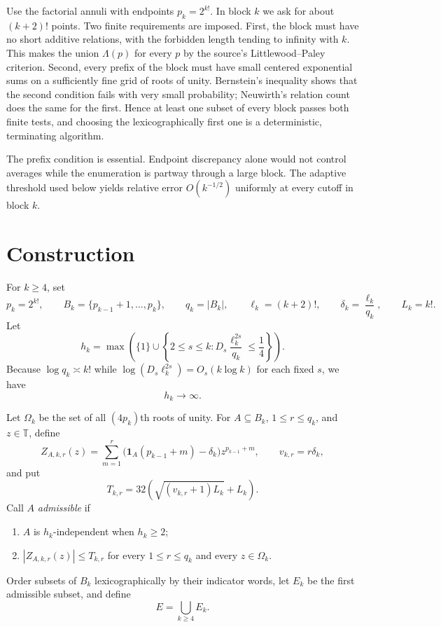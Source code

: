 \documentclass[11pt]{amsart}
\newcommand{\T}{\mathbb T}
\newcommand{\1}{\mathbf 1}
\newcommand{\card}[1]{\lvert #1\rvert}
\theoremstyle{definition}
\theoremstyle{remark}
\begin{document}
Use the factorial annuli with endpoints $p_k=2^{k!}$.  In block $k$ we ask
for about $(k+2)!$ points.  Two finite requirements are imposed.  First, the
block must have no short additive relations, with the forbidden length
tending to infinity with $k$.  This makes the union $\Lambda(p)$ for every
$p$ by the source's Littlewood--Paley criterion.  Second, every prefix of the
block must have small centered exponential sums on a sufficiently fine grid
of roots of unity.  Bernstein's inequality shows that the second condition
fails with very small probability; Neuwirth's relation count does the same
for the first.  Hence at least one subset of every block passes both finite
tests, and choosing the lexicographically first one is a deterministic,
terminating algorithm.

The prefix condition is essential.  Endpoint discrepancy alone would not
control averages while the enumeration is partway through a large block.
The adaptive threshold used below yields relative error $O(k^{-1/2})$
uniformly at every cutoff in block $k$.

\section*{Construction}

For $k\ge4$, set
\[
 p_k=2^{k!},\qquad B_k=\{p_{k-1}+1,\ldots,p_k\},\qquad
 q_k=\card{B_k},\qquad \ell_k=(k+2)!,\qquad
 \delta_k=\frac{\ell_k}{q_k},\qquad L_k=k!.
\]
Let
\[
 h_k=\max\left(\{1\}\cup
 \left\{2\le s\le k:
 D_s\frac{\ell_k^{2s}}{q_k}\le\frac14\right\}\right).
\]
Because $\log q_k\asymp k!$ while
$\log(D_s\ell_k^{2s})=O_s(k\log k)$ for each fixed $s$, we have
\begin{equation}\label{eq:hk}
                         h_k\longrightarrow\infty.
\end{equation}

Let $\Omega_k$ be the set of all $(4p_k)$th roots of unity.  For
$A\subseteq B_k$, $1\le r\le q_k$, and $z\in\T$, define
\[
 Z_{A,k,r}(z)=
 \sum_{m=1}^r
 \big(\1_A(p_{k-1}+m)-\delta_k\big)z^{p_{k-1}+m},
 \qquad v_{k,r}=r\delta_k,
\]
and put
\[
 T_{k,r}=32\left(\sqrt{(v_{k,r}+1)L_k}+L_k\right).
\]
Call $A$ \emph{admissible} if
\begin{enumerate}[label=(A\arabic*)]
\item $A$ is $h_k$-independent when $h_k\ge2$;
\item $|Z_{A,k,r}(z)|\le T_{k,r}$ for every
$1\le r\le q_k$ and every $z\in\Omega_k$.
\end{enumerate}
Order subsets of $B_k$ lexicographically by their indicator words, let
$E_k$ be the first admissible subset, and define
\[
                              E=\bigcup_{k\ge4}E_k.
\]
\end{document}
